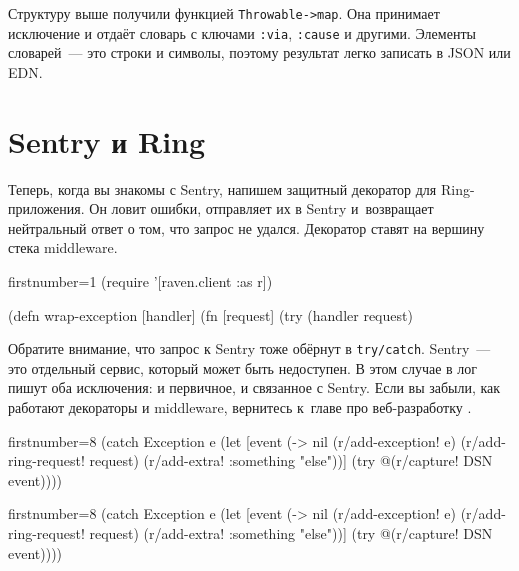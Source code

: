 
Структуру выше получили функцией \verb|Throwable->map|. Она принимает
исключение и отдаёт словарь с ключами \verb|:via|, \verb|:cause| и
другими. Элементы словарей~--- это строки и символы, поэтому результат легко
записать в JSON или EDN.

\section{Sentry и Ring}


Теперь, когда вы знакомы с Sentry, напишем защитный декоратор для
Ring-приложения. Он ловит ошибки, отправляет их в Sentry и~возвращает
нейтральный ответ о том, что запрос не удался. Декоратор ставят на вершину стека
middleware.

\begin{english}
  \begin{clojure/lines*}{firstnumber=1}
(require '[raven.client :as r])

(defn wrap-exception
  [handler]
  (fn [request]
    (try
      (handler request)
  \end{clojure/lines*}
\end{english}

\wavebottom

Обратите внимание, что запрос к Sentry тоже обёрнут в \verb|try/catch|. Sentry~---
это отдельный сервис, который может быть недоступен. В этом случае в лог пишут
оба исключения: и первичное, и связанное с Sentry. Если вы забыли, как работают
декораторы и middleware, вернитесь к~главе про веб-разработку .

\wavetop

\ifx\devicetype\mobile

\begin{english}
  \begin{clojure/lines*}{firstnumber=8}
      (catch Exception e
        (let [event
              (->
                nil
                (r/add-exception! e)
                (r/add-ring-request!
                  request)
                (r/add-extra!
                  {:something
                   "else"}))]
          (try
            @(r/capture!
               DSN event))))
  \end{clojure/lines*}
\end{english}

\else

\begin{english}
  \begin{clojure/lines*}{firstnumber=8}
      (catch Exception e
        (let [event (-> nil
                        (r/add-exception! e)
                        (r/add-ring-request! request)
                        (r/add-extra! {:something "else"}))]
          (try
            @(r/capture! DSN event))))
  \end{clojure/lines*}
\end{english}

